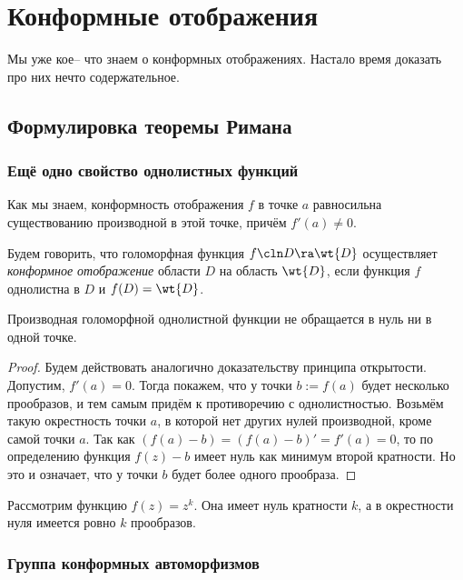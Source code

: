 \documentclass[a4paper]{article}
\begin{document}
\section{Конформные отображения}

Мы уже кое-- что знаем о конформных отображениях. Настало время доказать про них нечто содержательное.

\subsection{Формулировка теоремы Римана}

\subsubsection{Ещё одно свойство однолистных функций}

Как мы знаем, конформность отображения $f$ в точке $a$ равносильна существованию производной в этой точке, причём $f'(a)\neq 0$.

\begin{df}
Будем говорить, что голоморфная функция $f\cln D\ra\wt{D}$ осуществляет \emph{конформное отображение} области $D$ на область $\wt{D}$, если
функция $f$ однолистна в $D$ и $f(D) = \wt{D}$.
\end{df}

\begin{stm}
Производная голоморфной однолистной функции не обращается в нуль ни в одной точке.
\end{stm}
\begin{proof}
Будем действовать аналогично доказательству принципа открытости. Допустим, $f'(a)=0$. Тогда покажем,
что у точки $b:=f(a)$ будет несколько прообразов, и тем самым придём к противоречию с однолистностью.
Возьмём такую окрестность точки $a$, в которой нет других нулей производной, кроме самой точки $a$. Так как
$(f(a)-b) = (f(a)-b)'=f'(a)=0$, то по определению функция $f(z)-b$ имеет нуль как минимум второй кратности.
Но это и означает, что у точки $b$ будет более одного прообраза.
\end{proof}

\begin{ex}
Рассмотрим функцию $f(z) = z^k$. Она имеет нуль кратности $k$, а в окрестности нуля имеется ровно $k$ прообразов.
\end{ex}

\subsubsection{Группа конформных автоморфизмов}
\end{document}
